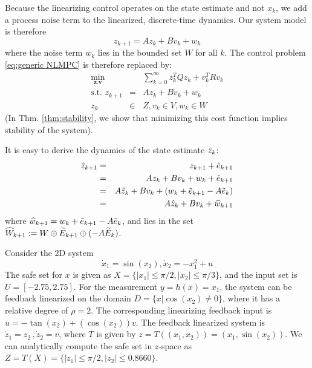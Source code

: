 Because the linearizing control operates on the state estimate and not $x_k$, we add a process noise term to the linearized, discrete-time dynamics. 
Our system model is therefore
\begin{equation}
\label{eq:discrete linear dyn}
z_{k+1} = Az_k + Bv_k + w_k
\end{equation}
where the noise term $w_k$ lies in the bounded set $W$ for all $k$.
The control problem \eqref{eq:generic NLMPC} is therefore replaced by:
\begin{eqnarray}
\label{eq:discrete linear problem}
\min_{\textbf{z},\textbf{v}} &\;& \sum_{k=0}^{\infty}z_k^TQz_k + v_k^TRv_k \\
\text{s.t. } z_{k+1} &=& Az_k + Bv_k + w_k\nonumber \\
z_k&\in& Z,  v_k \in V,w_k \in W  \nonumber
\end{eqnarray}
(In Thm. \ref{thm:stability}, we show that minimizing this cost function implies stability of the system).

It is easy to derive the dynamics of the state estimate $\hat{z}_{k}$: 
\begin{eqnarray}
\label{eq:dynamics_estimate}
\hat{z}_{k+1} &=& z_{k+1} + \tilde{e}_{k+1} \\
&=&Az_k + Bv_k + w_k + \tilde{e}_{k+1}  \nonumber\\
&=&A\hat{z}_k + Bv_k + (w_k+ \tilde{e}_{k+1} -A \tilde{e}_{k}) \nonumber\\
&=&A\hat{z}_k + Bv_k + \widehat{w}_{k+1} \nonumber
\end{eqnarray}
where $\widehat{w}_{k+1} = w_k+ \tilde{e}_{k+1} -A \tilde{e}_{k}$, and lies in the set $\widehat{W}_{k+1} := W\oplus\widetilde{E}_{k+1}\oplus(-A\widetilde{E}_k)$. 

\begin{exmp}
	Consider the 2D system 
	\begin{equation}
	\label{eq:toy_dynamics}
	\dot{x}_1 = \sin(x_2) , \dot{x}_2 =-x_1^2 + u 
	\end{equation}
	The safe set for $x$ is given as $X = \lbrace |x_1| \leq \pi /2, |x_2| \leq \pi/3 \rbrace$, and the input set is $U = [-2.75, 2.75]$.
	For the measurement $y = h(x) = x_1$, the system can be feedback linearized on the domain $D = \lbrace x | \cos(x_2) \neq 0 \rbrace $, where it has a relative degree of $\rho=2$. 
	The corresponding linearizing feedback input is $u = -\tan(x_2) + (\cos(x_2))v$.
	The feedback linearized system is $\dot{z}_1 = z_2\, ,\dot{z}_2 = v$, where $T$ is given by $z=T((x_1,x_2)) = (x_1, \sin(x_2))$.	
	We can analytically compute the safe set in $z$-space as $Z = T(X) =  \lbrace |z_1| \leq \pi /2, |z_2| \leq 0.8660\rbrace$.
	\exmend
\end{exmp}

